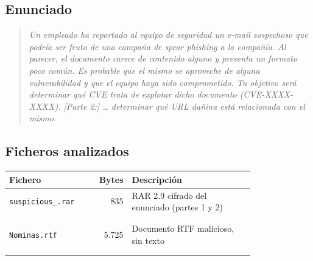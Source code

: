 \documentclass[11pt,a4paper]{article}
\begin{document}
\subsection{Enunciado}
\begin{quote}\itshape
Un empleado ha reportado al equipo de seguridad un e-mail sospechoso que podría ser fruto de una campaña de spear
phishing a la compañía. Al parecer, el documento carece de contenido alguno y presenta un formato poco común. Es
probable que el mismo se aproveche de alguna vulnerabilidad y que el equipo haya sido comprometido. Tu objetivo será
determinar qué CVE trata de explotar dicho documento (CVE-XXXX-XXXX). \textup{[Parte 2:]} \dots{} determinar qué URL
dañina está relacionada con el mismo.
\end{quote}

\subsection{Ficheros analizados}
\begin{longtable}{@{}L{0.30\linewidth}r L{0.50\linewidth}@{}}
\toprule \textbf{Fichero} & \textbf{Bytes} & \textbf{Descripción} \\ \midrule \endhead
\texttt{suspicious\_.rar} & 835 & RAR 2.9 cifrado del enunciado (partes 1 y 2) \\ \nopagebreak
{} \\ \nopagebreak
{} \\ \midrule
\texttt{Nominas.rtf} & 5.725 & Documento RTF malicioso, sin texto \\ \nopagebreak
{} \\ \nopagebreak
{} \\ \midrule
\end{longtable}
\end{document}
